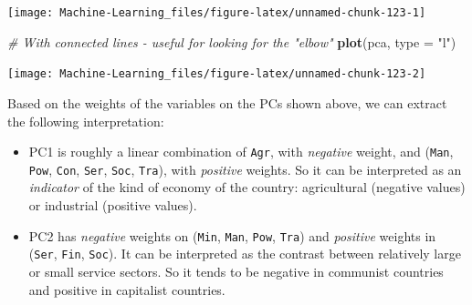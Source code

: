 \documentclass[]{book}
\newenvironment{Shaded}{\begin{snugshade}}{\end{snugshade}}
\newcommand{\KeywordTok}[1]{\textcolor[rgb]{0.13,0.29,0.53}{\textbf{#1}}}
\newcommand{\DataTypeTok}[1]{\textcolor[rgb]{0.13,0.29,0.53}{#1}}
\newcommand{\DecValTok}[1]{\textcolor[rgb]{0.00,0.00,0.81}{#1}}
\newcommand{\StringTok}[1]{\textcolor[rgb]{0.31,0.60,0.02}{#1}}
\newcommand{\CommentTok}[1]{\textcolor[rgb]{0.56,0.35,0.01}{\textit{#1}}}
\newcommand{\OperatorTok}[1]{\textcolor[rgb]{0.81,0.36,0.00}{\textbf{#1}}}
\newcommand{\NormalTok}[1]{#1}
\providecommand{\tightlist}{%
  \setlength{\itemsep}{0pt}\setlength{\parskip}{0pt}}
\theoremstyle{definition}
\theoremstyle{definition}
\theoremstyle{definition}
\theoremstyle{remark}
\begin{document}
\begin{center}\texttt{[image: Machine-Learning\_files/figure-latex/unnamed-chunk-123-1]} \end{center}

\begin{Shaded}
\begin{Highlighting}[]

\CommentTok{# With connected lines - useful for looking for the "elbow"}
\KeywordTok{plot}\NormalTok{(pca, }\DataTypeTok{type =} \StringTok{"l"}\NormalTok{)}
\end{Highlighting}
\end{Shaded}

\begin{center}\texttt{[image: Machine-Learning\_files/figure-latex/unnamed-chunk-123-2]} \end{center}

\begin{Shaded}
\end{Shaded}

Based on the weights of the variables on the PCs shown above, we can
extract the following interpretation:

\begin{itemize}
\tightlist
\item
  PC1 is roughly a linear combination of \texttt{Agr}, with
  \emph{negative} weight, and (\texttt{Man}, \texttt{Pow}, \texttt{Con},
  \texttt{Ser}, \texttt{Soc}, \texttt{Tra}), with \emph{positive}
  weights. So it can be interpreted as an \emph{indicator} of the kind
  of economy of the country: agricultural (negative values) or
  industrial (positive values).
\item
  PC2 has \emph{negative} weights on (\texttt{Min}, \texttt{Man},
  \texttt{Pow}, \texttt{Tra}) and \emph{positive} weights in
  (\texttt{Ser}, \texttt{Fin}, \texttt{Soc}). It can be interpreted as
  the contrast between relatively large or small service sectors. So it
  tends to be negative in communist countries and positive in capitalist
  countries.
\end{itemize}
\end{document}
